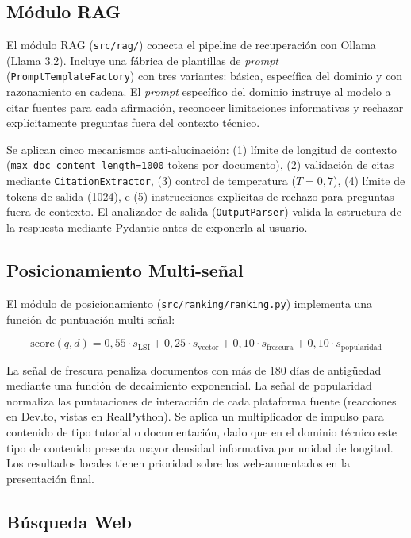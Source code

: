 \documentclass[runningheads,a4paper]{llncs}
\begin{document}
\subsection{Módulo RAG}

El módulo RAG (\texttt{src/rag/}) conecta el pipeline de recuperación con Ollama (Llama 3.2). Incluye una fábrica de plantillas de \emph{prompt} (\texttt{PromptTemplateFactory}) con tres variantes: básica, específica del dominio y con razonamiento en cadena. El \emph{prompt} específico del dominio instruye al modelo a citar fuentes para cada afirmación, reconocer limitaciones informativas y rechazar explícitamente preguntas fuera del contexto técnico.

Se aplican cinco mecanismos anti-alucinación: (1) límite de longitud de contexto (\texttt{max\_doc\_content\_length=1000} tokens por documento), (2) validación de citas mediante \texttt{CitationExtractor}, (3) control de temperatura ($T=0{,}7$), (4) límite de tokens de salida (1024), e (5) instrucciones explícitas de rechazo para preguntas fuera de contexto. El analizador de salida (\texttt{OutputParser}) valida la estructura de la respuesta mediante Pydantic antes de exponerla al usuario.

\subsection{Posicionamiento Multi-señal}

El módulo de posicionamiento (\texttt{src/ranking/ranking.py}) implementa una función de puntuación multi-señal:

$$\text{score}(q, d) = 0{,}55 \cdot s_\text{LSI} + 0{,}25 \cdot s_\text{vector} + 0{,}10 \cdot s_\text{frescura} + 0{,}10 \cdot s_\text{popularidad}$$

La señal de frescura penaliza documentos con más de 180 días de antigüedad mediante una función de decaimiento exponencial. La señal de popularidad normaliza las puntuaciones de interacción de cada plataforma fuente (reacciones en Dev.to, vistas en RealPython). Se aplica un multiplicador de impulso para contenido de tipo tutorial o documentación, dado que en el dominio técnico este tipo de contenido presenta mayor densidad informativa por unidad de longitud. Los resultados locales tienen prioridad sobre los web-aumentados en la presentación final.

\subsection{Búsqueda Web}
\end{document}
